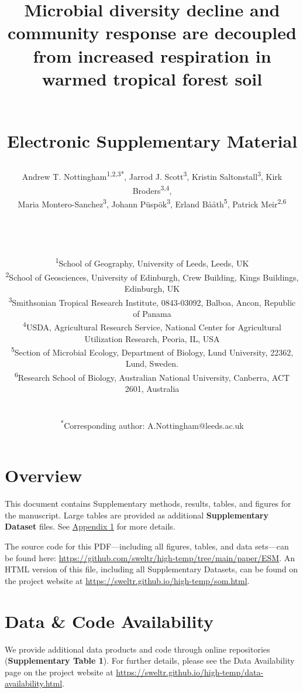 \documentclass[
  10pt,
  letterpaper,
  DIV=11,
  numbers=noendperiod]{scrartcl}
\date{}
\title{\LARGE Microbial diversity decline and community response are
decoupled from increased respiration in warmed tropical forest soil\\
\strut \\
Electronic Supplementary Material}
\author{Andrew T. Nottingham\textsuperscript{1,2,3*}, Jarrod J.
Scott\textsuperscript{3}, Kristin Saltonstall\textsuperscript{3}, Kirk
Broders\textsuperscript{3,4},\\
Maria Montero-Sanchez\textsuperscript{3}, Johann
Püspök\textsuperscript{3}, Erland Bååth\textsuperscript{5}, Patrick
Meir\textsuperscript{2,6}\\
\strut \\
\strut \\
\RaggedRight \small \textsuperscript{1}School of Geography, University
of Leeds, Leeds, UK\\
\small \textsuperscript{2}School of Geosciences, University of
Edinburgh, Crew Building, Kings Buildings, Edinburgh, UK\\
\small \textsuperscript{3}Smithsonian Tropical Research Institute,
0843-03092, Balboa, Ancon, Republic of Panama\\
\small \textsuperscript{4}USDA, Agricultural Research Service, National
Center for Agricultural Utilization Research, Peoria, IL, USA\\
\small \textsuperscript{5}Section of Microbial Ecology, Department of
Biology, Lund University, 22362, Lund, Sweden.\\
\small \textsuperscript{6}Research School of Biology, Australian
National University, Canberra, ACT 2601, Australia\\
\strut \\
\small \textsuperscript{*}Corresponding author:
A.Nottingham@leeds.ac.uk}
\date{}
\renewcommand*\contentsname{Table of contents}
\newcommand\contentsname{Table of contents}
\begin{document}
\maketitle
\ifdefined\Shaded\renewenvironment{Shaded}{\begin{tcolorbox}[interior hidden, borderline west={3pt}{0pt}{shadecolor}, boxrule=0pt, breakable, enhanced, frame hidden, sharp corners]}{\end{tcolorbox}}\fi

\renewcommand*\contentsname{Contents}
{
\hypersetup{linkcolor=}
\setcounter{tocdepth}{2}
\tableofcontents
}
\listoffigures
\listoftables
\hypertarget{overview}{%
\section{Overview}\label{overview}}

This document contains Supplementary methods, results, tables, and
figures for the manuscript. Large tables are provided as additional
\textbf{Supplementary Dataset} files. See
\hyperref[appendix-1]{\color{blue}Appendix 1} for more details.

\begin{tcolorbox}[enhanced jigsaw, colframe=quarto-callout-note-color-frame, opacityback=0, breakable, colback=white, bottomrule=.15mm, arc=.35mm, toprule=.15mm, rightrule=.15mm, leftrule=.75mm, left=2mm]
The source code for this PDF---including all figures, tables, and data
sets---can be found here:
\url{https://github.com/sweltr/high-temp/tree/main/paper/ESM}. An HTML
version of this file, including all Supplementary Datasets, can be found
on the project website at
\url{https://sweltr.github.io/high-temp/som.html}.
\end{tcolorbox}

\hypertarget{data-code-availability}{%
\section{Data \& Code Availability}\label{data-code-availability}}

We provide additional data products and code through online repositories
(\textbf{Supplementary Table 1}). For further details, please see the
Data Availability page on the project website at
\url{https://sweltr.github.io/high-temp/data-availability.html}.
\end{document}
